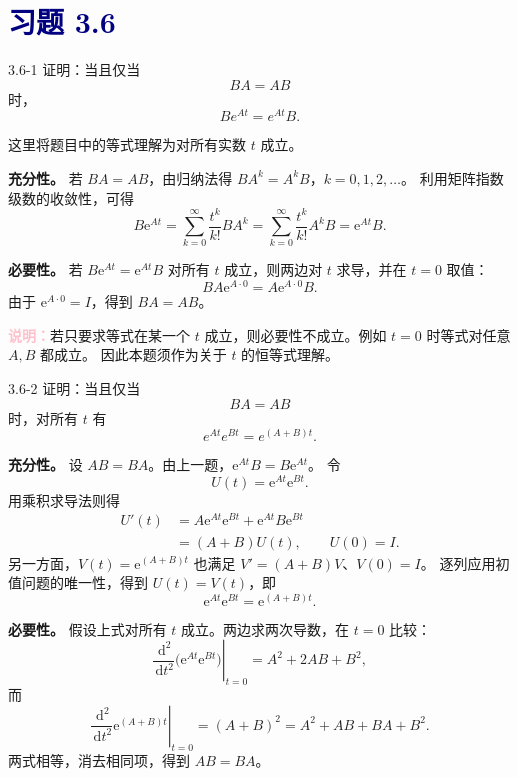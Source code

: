 \documentclass[UTF8,a4paper,11pt]{ctexart}
\newcommand{\dd}{\,\mathrm d}
\newcommand{\e}{\mathrm e}
\newcommand{\note}[1]{\par\smallskip\noindent\textcolor{pink}{\bfseries 说明：}#1\par\smallskip}
\newcommand{\sect}[1]{\section*{\textcolor{navy}{习题 #1}}}
\begin{document}
\sect{3.6}
\begin{problem}{3.6-1}
证明：当且仅当
  \[
    BA=AB
  \]
  时，
  \[
    Be^{At}=e^{At}B.
  \]
\end{problem}

\begin{solution}
这里将题目中的等式理解为对所有实数 $t$ 成立。

\textbf{充分性。} 若 $BA=AB$，由归纳法得 $BA^k=A^kB$，$k=0,1,2,\ldots$。
利用矩阵指数级数的收敛性，可得
\[
B\e^{At}
=\sum_{k=0}^{\infty}\frac{t^k}{k!}BA^k
=\sum_{k=0}^{\infty}\frac{t^k}{k!}A^kB
=\e^{At}B.
\]

\textbf{必要性。} 若 $B\e^{At}=\e^{At}B$ 对所有 $t$ 成立，则两边对 $t$ 求导，并在 $t=0$ 取值：
\[
B A\e^{A\cdot0}=A\e^{A\cdot0}B.
\]
由于 $\e^{A\cdot0}=I$，得到 $BA=AB$。

\note{若只要求等式在某一个 $t$ 成立，则必要性不成立。例如 $t=0$ 时等式对任意 $A,B$ 都成立。
因此本题须作为关于 $t$ 的恒等式理解。}
\end{solution}

\begin{problem}{3.6-2}
证明：当且仅当
  \[
    BA=AB
  \]
  时，对所有 $t$ 有
  \[
    e^{At}e^{Bt}=e^{(A+B)t}.
  \]
\end{problem}

\begin{solution}
\textbf{充分性。} 设 $AB=BA$。由上一题，$\e^{At}B=B\e^{At}$。
令
\[
U(t)=\e^{At}\e^{Bt}.
\]
用乘积求导法则得
\[
\begin{aligned}
U'(t)
&=A\e^{At}\e^{Bt}+\e^{At}B\e^{Bt}\\
&=(A+B)U(t),\qquad U(0)=I.
\end{aligned}
\]
另一方面，$V(t)=\e^{(A+B)t}$ 也满足 $V'=(A+B)V$、$V(0)=I$。
逐列应用初值问题的唯一性，得到 $U(t)=V(t)$，即
\[
\boxed{\e^{At}\e^{Bt}=\e^{(A+B)t}.}
\]

\textbf{必要性。} 假设上式对所有 $t$ 成立。两边求两次导数，在 $t=0$ 比较：
\[
\left.\frac{\dd^2}{\dd t^2}\bigl(\e^{At}\e^{Bt}\bigr)\right|_{t=0}
=A^2+2AB+B^2,
\]
而
\[
\left.\frac{\dd^2}{\dd t^2}\e^{(A+B)t}\right|_{t=0}
=(A+B)^2=A^2+AB+BA+B^2.
\]
两式相等，消去相同项，得到 $AB=BA$。
\end{solution}
\end{document}
